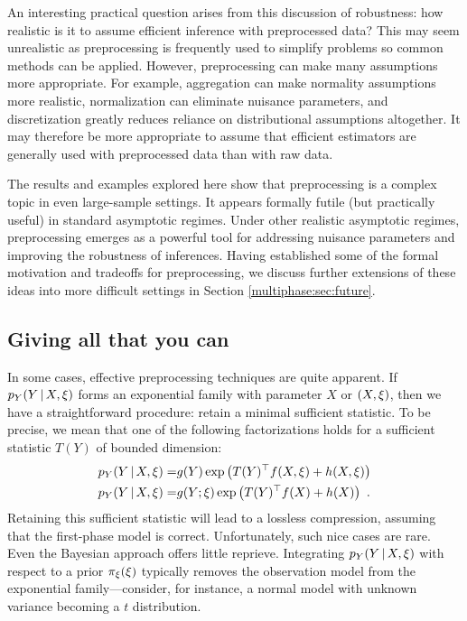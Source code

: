 An interesting practical question arises from this discussion of robustness: how realistic is it to assume efficient inference with preprocessed data?
This may seem unrealistic as preprocessing is frequently used to simplify problems so common methods can be applied.
However, preprocessing can make many assumptions more appropriate.
For example, aggregation can make normality assumptions more realistic, normalization can eliminate nuisance parameters, and discretization greatly reduces reliance on distributional assumptions altogether.
It may therefore be more appropriate to assume that efficient estimators are generally used with preprocessed data than with raw data.

The results and examples explored here show that preprocessing is a complex topic in even large-sample settings.
It appears formally futile (but practically useful) in standard asymptotic regimes. Under other realistic asymptotic regimes, preprocessing emerges as a powerful tool for addressing nuisance parameters and improving the robustness of inferences.
Having established some of the formal motivation and tradeoffs for preprocessing, we discuss further extensions of these ideas into more difficult settings in Section \ref{multiphase:sec:future}.

\subsection{Giving all that you can}
\label{multiphase:sec:completeclass}

In some cases, effective preprocessing techniques are quite apparent.
If $p_Y(Y \, | \, X, \xi)$ forms an exponential family with parameter $X$ or $(X, \xi)$, then we have a straightforward procedure: retain a minimal sufficient statistic.
To be precise, we mean that one of the following factorizations holds for a sufficient statistic $T(Y)$ of bounded dimension:
\begin{align}
 \nonumber
 p_Y(Y \, | \, X, \xi) =& g(Y) \exp\left(T(Y)^\top f(X, \xi) + h(X, \xi)\right) \\
 \nonumber
 p_Y(Y \, | \, X, \xi) =& g(Y; \xi) \exp\left(T(Y)^\top f(X) + h(X)\right)\ .
\end{align}
Retaining this sufficient statistic will lead to a lossless compression,  assuming that the first-phase model is correct.
Unfortunately, such nice cases are rare.
Even the Bayesian approach offers little reprieve.
Integrating $p_Y(Y \, | \, X, \xi)$ with respect to a prior $\pi_{\xi}(\xi)$ typically removes the observation model from the exponential family---consider, for instance, a normal model with unknown variance becoming a $t$ distribution.

